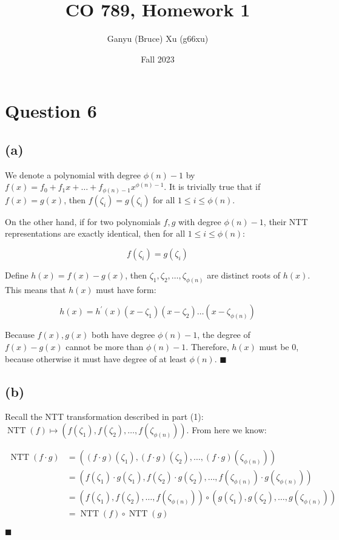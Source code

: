 \documentclass{article}
\title{CO 789, Homework 1}
\author{Ganyu (Bruce) Xu (g66xu)}
\date{Fall 2023}
\begin{document}

\section*{Question 6}
\subsection*{(a)}
We denote a polynomial with degree $\phi(n) - 1$ by $f(x) = f_0 + f_1x + \ldots + f_{\phi(n)-1}x^{\phi(n)-1}$. It is trivially true that if $f(x) = g(x)$, then $f(\zeta_i) = g(\zeta_i)$ for all $1 \leq i \leq \phi(n)$.

On the other hand, if for two polynomials $f, g$ with degree $\phi(n) - 1$, their NTT representations are exactly identical, then for all $1 \leq i \leq \phi(n)$:

$$
f(\zeta_i) = g(\zeta_i)
$$

Define $h(x) = f(x) - g(x)$, then $\zeta_1, \zeta_2, \ldots, \zeta_{\phi(n)}$ are distinct roots of $h(x)$. This means that $h(x)$ must have form:

$$
h(x) = h^\prime(x)(x - \zeta_1)(x - \zeta_2) \ldots (x - \zeta_{\phi(n)})
$$

Because $f(x), g(x)$ both have degree $\phi(n) - 1$, the degree of $f(x) - g(x)$ cannot be more than $\phi(n) - 1$. Therefore, $h(x)$ must be $0$, because otherwise it must have degree of at least $\phi(n)$. $\blacksquare$

\subsection*{(b)}
Recall the NTT transformation described in part (1): $\operatorname{NTT}(f) \mapsto (f(\zeta_1), f(\zeta_2), \ldots, f(\zeta_{\phi(n)}))$. From here we know:

$$
\begin{aligned}
\operatorname{NTT}(f \cdot g) 
&= ((f \cdot g)(\zeta_1), (f \cdot g)(\zeta_2), \ldots, (f \cdot g)(\zeta_{\phi(n)})) \\
&= (f(\zeta_1) \cdot g(\zeta_1), f(\zeta_2) \cdot g(\zeta_2), \ldots, f(\zeta_{\phi(n)}) \cdot g(\zeta_{\phi(n)})) \\
&= (f(\zeta_1), f(\zeta_2), \ldots, f(\zeta_{\phi(n)})) \circ (g(\zeta_1), g(\zeta_2), \ldots, g(\zeta_{\phi(n)})) \\
&= \operatorname{NTT}(f) \circ \operatorname{NTT}(g)
\end{aligned}
$$

$\blacksquare$
\end{document}
